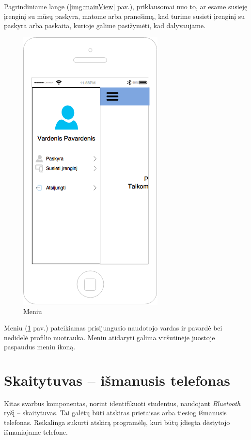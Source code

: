 \documentclass{VUMIFPSkursinis}
\begin{document}
Pagrindiniame lange (\ref{img:mainView} pav.), priklausomai nuo to, ar esame susieję įrenginį su mūsų paskyra, matome arba pranešimą, kad turime susieti įrenginį su paskyra arba paskaita, kurioje galime pasižymėti, kad dalyvaujame.

\begin{figure}[H]
	\centering
	\includegraphics[scale=0.5]{img/kursinio_app_menu}
	\caption{Meniu}
	\label{img:menuView}
\end{figure}

Meniu (\ref{img:menuView} pav.) pateikiamas prisijungusio naudotojo vardas ir pavardė bei nedidelė profilio nuotrauka. Meniu atidaryti galima viršutinėje juostoje paspaudus meniu ikoną.

\section{Skaitytuvas – išmanusis telefonas} \label{TeacherApp}
Kitas svarbus komponentas, norint identifikuoti studentus, naudojant \textit{Bluetooth} ryšį – skaitytuvas. Tai galėtų būti atskiras prietaisas arba tiesiog išmanusis telefonas. Reikalinga sukurti atskirą programėlę, kuri būtų įdiegta dėstytojo išmaniajame telefone.
\end{document}
